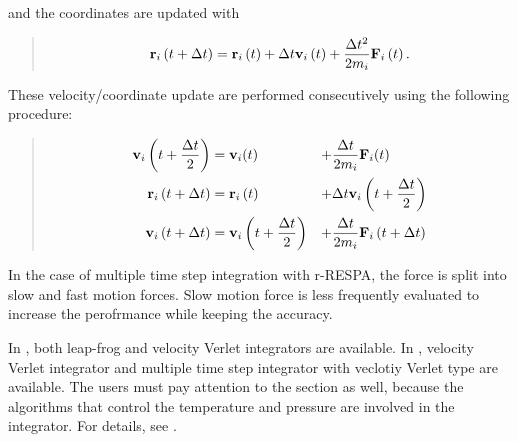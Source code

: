\documentclass[a4paper,11pt,oneside,english]{sphinxmanual}
\begin{document}
and the coordinates are updated with
\begin{quote}

\vspace{-5mm}
\begin{equation*}
\begin{split}{{\bf{r}}_i}\left( t + \Delta t \right) = {{\bf{r}}_i}\left( t \right) + \Delta t{{\bf{v}}_i}\left( t \right) + \frac{{\Delta {t^2}}}{{{2m_i}}}{{\bf{F}}_i}\left( t \right).\end{split}
\end{equation*}
\vspace{-3mm}
\end{quote}

These velocity/coordinate update are performed consecutively using the following procedure:
\begin{quote}

\vspace{-5mm}
\begin{align*}\!\begin{aligned}
{{\bf{v}}_i}\left( t + \frac{\Delta t}{2} \right) &= {{\bf{v}}_i}(t) &+& \frac{\Delta t}{2{m_i}}{{\bf{F}}_i}(t)\\
{{\bf{r}}_i}\left( t + \Delta t \right) &= {{\bf{r}}_i}\left( t \right) &+& \Delta t{{\bf{v}}_i}\left( t + \frac{\Delta t}{2} \right)\\
{{\bf{v}}_i}\left( t + \Delta t \right) &= {{\bf{v}}_i}\left( t + \frac{\Delta t}{2} \right) &+& \frac{\Delta t}{2{m_i}} {{\bf{F}}_i}\left( t + \Delta t \right)\\
\end{aligned}\end{align*}
\vspace{-3mm}
\end{quote}

In the case of multiple time step integration with r-RESPA, the force is split into slow and fast motion forces.
Slow motion force is less frequently evaluated to increase the perofrmance while keeping the accuracy.

In , both leap-frog and velocity Verlet integrators are available.
In , velocity Verlet integrator and multiple time step integrator with veclotiy Verlet type are available.
The users must pay attention to the \sphinxstylestrong{{[}ENSEMBLE{]}} section as well,
because the algorithms that control the temperature and pressure are involved in the integrator.
For details, see {\hyperref[\detokenize{09_Ensemble:ensemble}]{}}.
\end{document}
